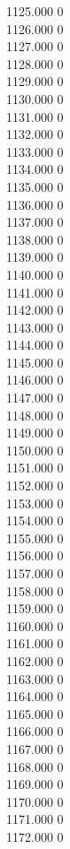 { 1125.000	0 \\
 1126.000	0 \\
 1127.000	0 \\
 1128.000	0 \\
 1129.000	0 \\
 1130.000	0 \\
 1131.000	0 \\
 1132.000	0 \\
 1133.000	0 \\
 1134.000	0 \\
 1135.000	0 \\
 1136.000	0 \\
 1137.000	0 \\
 1138.000	0 \\
 1139.000	0 \\
 1140.000	0 \\
 1141.000	0 \\
 1142.000	0 \\
 1143.000	0 \\
 1144.000	0 \\
 1145.000	0 \\
 1146.000	0 \\
 1147.000	0 \\
 1148.000	0 \\
 1149.000	0 \\
 1150.000	0 \\
 1151.000	0 \\
 1152.000	0 \\
 1153.000	0 \\
 1154.000	0 \\
 1155.000	0 \\
 1156.000	0 \\
 1157.000	0 \\
 1158.000	0 \\
 1159.000	0 \\
 1160.000	0 \\
 1161.000	0 \\
 1162.000	0 \\
 1163.000	0 \\
 1164.000	0 \\
 1165.000	0 \\
 1166.000	0 \\
 1167.000	0 \\
 1168.000	0 \\
 1169.000	0 \\
 1170.000	0 \\
 1171.000	0 \\
 1172.000	0 \\
}
